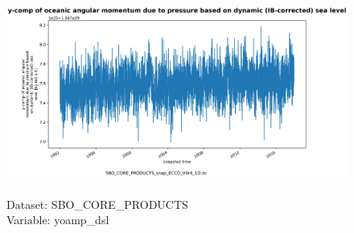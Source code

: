 \begin{figure}[H]
\centering
\includegraphics[scale=0.5]{../images/plots/oneD_plots/SBO_Core_Products/yoamp_dsl.png}
\caption{\\Dataset: SBO\_CORE\_PRODUCTS\\Variable: yoamp\_dsl}
\label{tab:table-SBO_CORE_PRODUCTS_yoamp_dsl-Plot}
\end{figure}
\pagebreak
